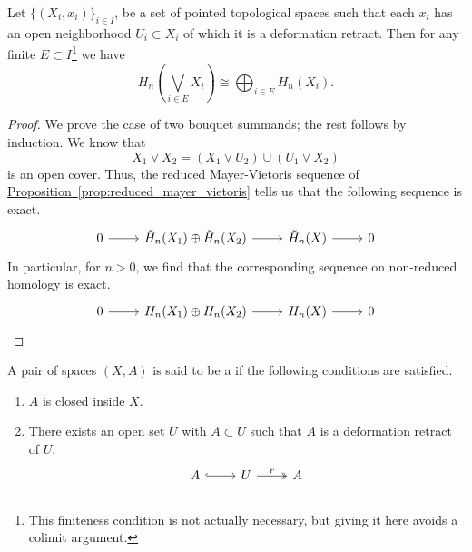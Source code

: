 \documentclass[main.tex]{subfiles}
\begin{document}
\begin{proposition}
  Let $\{(X_{i}, x_{i})\}_{i \in I}$, be a set of pointed topological spaces such that each $x_{i}$ has an open neighborhood $U_{i} \subset X_{i}$ of which it is a deformation retract. Then for any finite $E \subset I$\footnote{This finiteness condition is not actually necessary, but giving it here avoids a colimit argument.} we have
  \begin{equation*}
    \tilde{H}_{n}\left(\bigvee_{i \in E} X_{i}\right) \cong \bigoplus_{i \in E} \tilde{H}_{n}(X_{i}).
  \end{equation*}
\end{proposition}
\begin{proof}
  We prove the case of two bouquet summands; the rest follows by induction. We know that
  \begin{equation*}
    X_{1} \vee X_{2} = (X_{1} \vee U_{2}) \cup (U_{1} \vee X_{2})
  \end{equation*}
  is an open cover. Thus, the reduced Mayer-Vietoris sequence of \hyperref[prop:reduced_mayer_vietoris]{Proposition~\ref*{prop:reduced_mayer_vietoris}} tells us that the following sequence is exact.
  \begin{equation*}
    \begin{tikzcd}
      0
      \arrow[r]
      & \tilde{H}_{n}(X_{1}) \oplus \tilde{H}_{n}(X_{2})
      \arrow[r]
      & \tilde{H}_{n}(X)
      \arrow[r]
      & 0
    \end{tikzcd}
  \end{equation*}
  In particular, for $n > 0$, we find that the corresponding sequence on non-reduced homology is exact.
  \begin{equation*}
    \begin{tikzcd}
      0
      \arrow[r]
      & H_{n}(X_{1}) \oplus H_{n}(X_{2})
      \arrow[r]
      & H_{n}(X)
      \arrow[r]
      & 0
    \end{tikzcd}
  \end{equation*}
\end{proof}

\begin{definition}
  \label{def:good_pair}
  A pair of spaces $(X, A)$ is said to be a  if the following conditions are satisfied.
  \begin{enumerate}
    \item $A$ is closed inside $X$.

    \item There exists an open set $U$ with $A \subset U$ such that $A$ is a deformation retract of $U$.
      \begin{equation*}
        \begin{tikzcd}
          A
          \arrow[r, hook]
          & U
          \arrow[r, two heads, "r"]
          & A
        \end{tikzcd}
      \end{equation*}
  \end{enumerate}
\end{definition}
\end{document}

